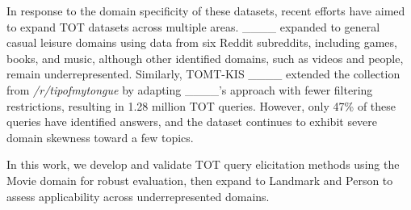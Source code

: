 In response to the domain specificity of these datasets, recent efforts have aimed to expand TOT datasets across multiple areas. ____ expanded to general casual leisure domains using data from six Reddit subreddits, including games, books, and music, although other identified domains, such as videos and people, remain underrepresented. Similarly, TOMT-KIS ____ extended the collection from \textit{/r/tipofmytongue} by adapting ____'s approach with fewer filtering restrictions, resulting in 1.28 million TOT queries. However, only 47\% of these queries have identified answers, and the dataset continues to exhibit severe domain skewness toward a few topics. 


In this work, we develop and validate TOT query elicitation methods using the Movie domain for robust evaluation, then expand to Landmark and Person to assess applicability across underrepresented domains.